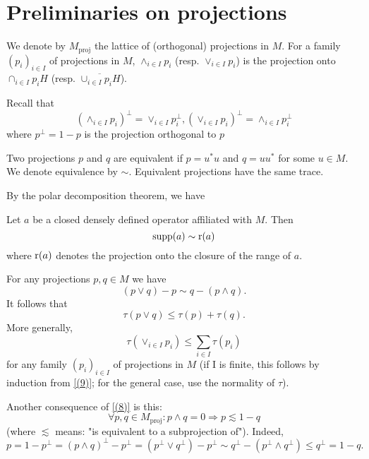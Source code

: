 \section{Preliminaries on projections}
We denote by $M_{\text{proj}}$ the lattice of (orthogonal) projections in $M$. For a family $(p_i)_{i\in I}$ of projections in $M$, $\wedge_{i\in I}p_i$ (resp. $\vee_{i\in I}p_i$) is the projection onto $\cap_{i\in I}p_iH$ (resp. $\overline{\cup_{i\in I}p_iH}$).\par
Recall that
\begin{equation}
    (\wedge_{i\in I}p_i)^\perp=\vee_{i\in I}p_i^\perp, (\vee_{i\in I}p_i)^\perp=\wedge_{i\in I}p_i^\perp
\end{equation}
where $p^\perp=1-p$ is the projection orthogonal to $p$\par
Two projections $p$ and $q$ are equivalent if $p=u^*u$ and $q=uu^*$ for some $u\in M$. We denote equivalence by $\sim$. Equivalent projections have the same trace.\par
By the polar decomposition theorem, we have
\begin{lemma}
    Let $a$ be a closed densely defined operator affiliated
    with $M$. Then
    \[
        \operatorname{supp}(a)\sim \operatorname{r}(a)
    \]
    where $\operatorname{r}(a)$ denotes the projection onto the closure of the range of $a$.
\end{lemma}
For any projections $p,q\in M$ we have
\begin{equation}\label{(8)}
    (p\vee q)-p\sim q-(p\wedge q).
\end{equation}
It follows that
\begin{equation}\label{(9)}
    \tau(p\vee q)\leq \tau(p)+\tau(q).
\end{equation}
More generally,
\begin{equation}
    \tau(\vee_{i\in I}p_i)\leq \sum_{i\in I}\tau(p_i)
\end{equation}
for any family $(p_i)_{i\in I}$ of projections in $M$ (if I is finite, this follows by induction from \eqref{(9)}; for the general case, use the normality of $\tau$).\par
Another consequence of \eqref{(8)} is this:
\begin{equation}\label{(11)}
    \forall p,q\in M_{\text{proj}}: p\wedge q=0\Rightarrow p\lesssim 1-q
\end{equation}
(where $\lesssim$ means: "is equivalent to a subprojection of"). Indeed,
\[
    p=1-p^\perp=(p\wedge q)^\perp-p^\perp=(p^\perp\vee q^\perp)-p^\perp\sim q^\perp-(p^\perp \wedge q^\perp)\leq q^\perp=1-q.
\]
